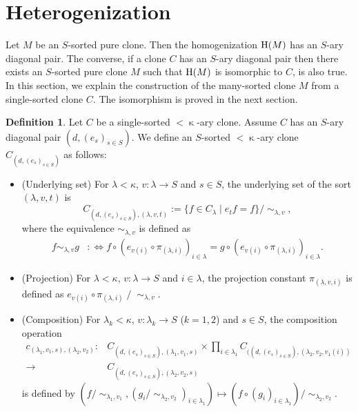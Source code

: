 \documentclass[a4paper,10pt]{article}
\theoremstyle{definition}
\newtheorem{df}{Definition}[section]
\newcommand\ra{\rightarrow}
\newcommand\mc{\mathclose}
\begin{document}
\section{Heterogenization} \label{s-heterogenization}

Let $M$ be an $S$-sorted pure clone.
Then the homogenization ${\rm H}(M)$ has an $S$-ary diagonal pair.
The converse, if a clone $C$ has an $S$-ary diagonal pair
then there exists an $S$-sorted pure clone $M$ such that ${\rm H}(M)$
is isomorphic to $C$, is also true.
In this section, we explain the construction of the many-sorted clone $M$ from a single-sorted clone $C$.
The isomorphism is proved in the next section.

\begin{df}\label{heterogenization-clone}
Let $C$ be a single-sorted $<\mc\kappa$-ary clone. Assume $C$ has an $S$-ary diagonal pair $(d,(e_s)_{s\in S})$.
We define an $S$-sorted $<\mc\kappa$-ary clone $C_{(d,(e_s)_{s\in S})}$ as follows:
\begin{itemize}
\item (Underlying set)
For $\lambda<\kappa$, $v:\lambda\ra S$ and $s\in S$,
the underlying set of the sort $(\lambda,v,t)$
is
\[
C_{(d,(e_s)_{s\in S}),(\lambda,v,t)}
:=\{f\in C_\lambda\mid
 e_tf=f\}/\mc\sim_{\lambda,v},
\]
where the equivalence $\sim_{\lambda,v}$ is defined as
\begin{align*}
f\sim_{\lambda,v} g &:\Longleftrightarrow 
f\circ (e_{v(i)}\circ \pi_{(\lambda,i)})_{i\in\lambda}
=g\circ (e_{v(i)}\circ \pi_{(\lambda,i)})_{i\in\lambda}.
\end{align*}
\item (Projection)
For $\lambda<\kappa$, $v:\lambda\ra S$ and $i\in\lambda$,
the projection constant $\pi_{(\lambda,v,i)}$ is defined as
$e_{v(i)}\circ \pi_{(\lambda,i)}\mc/\mc\sim_{\lambda,v}$.
\item (Composition)
For $\lambda_k<\kappa$, $v:\lambda_k\ra S$ ($k=1,2$) and $s\in S$,
the composition operation
\begin{align*}
c_{(\lambda_1,v_1,s),(\lambda_2,v_2)}:&
C_{(d,(e_s)_{s\in S}),(\lambda_1,v_1,s)}\times 
\prod_{i\in \lambda_1}C_{((d,(e_s)_{s\in S}),(\lambda_2,v_2,v_1(i))}\\
\ra & C_{(d,(e_s)_{s\in S}),(\lambda_2,v_2,s)}
\end{align*}
is defined by
$(f/\mc\sim_{\lambda_1,v_1},(g_i/\mc\sim_{\lambda_2,v_2})_{i\in\lambda_1})
\mapsto (f\circ(g_i)_{i\in\lambda_1})/\mc\sim_{\lambda_2,v_2}$.
\end{itemize}
\end{df}
\end{document}
